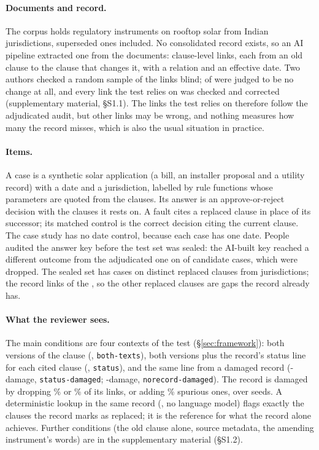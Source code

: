 \paragraph{Documents and record.}
The corpus holds \NCorpusDocs{} regulatory instruments on rooftop solar from \NCorpusJurisdictions{} Indian
jurisdictions, superseded ones included. No consolidated record exists, so an AI pipeline extracted one from the
documents: \NLinksRegistry{} clause-level links, each from an old clause to the clause that changes it, with a relation
and an effective date. Two authors checked a random sample of the links blind; \NLinksSampleNotALink{} of
\NLinksSample{} were judged to be no change at all, and every link the test relies on was checked and corrected
(supplementary material, \S S1.1). The links the test relies on therefore follow the adjudicated audit, but other links may be wrong, and nothing
measures how many the record misses, which is also the usual situation in practice.

\paragraph{Items.}
A case is a synthetic solar application (a bill, an installer proposal and a utility record) with a date and a
jurisdiction, labelled by rule functions whose parameters are quoted from the clauses. Its answer is an
approve-or-reject decision with the clauses it rests on. A fault cites a replaced clause in place of its successor; its
matched control is the correct decision citing the current clause. The case study has no date control, because each case has
one date. People audited the answer key before the test set was sealed: the AI-built key reached a different outcome
from the adjudicated one on \NDroppedDecision{} of \NCandidateCases{} candidate cases, which were dropped. The sealed
set has \NTestCases{} cases on \NClauses{} distinct replaced clauses from \NStates{} jurisdictions; the record links
\NRegistryFlagged{} of the \NClauses, so the other replaced clauses are gaps the record already has.

\paragraph{What the reviewer sees.}
The main conditions are four contexts of the test (\S\ref{sec:framework}): both versions of the clause (, \texttt{both-texts}),
both versions plus the record's status line for each cited clause (, \texttt{status}), and the same line from
a damaged record (-damage, \texttt{status-damaged}; -damage, \texttt{norecord-damaged}). The record
is damaged by dropping \DamageDropTwentyFive\% or \DamageDropFifty\% of its links, or adding \DamageSpuriousTen\%
spurious ones, over \NDamageSeeds{} seeds. A deterministic lookup in the same record (, no language model)
flags exactly the clauses the record marks as replaced; it is the reference for what the record alone achieves.
Further conditions (the old clause alone, source metadata, the amending instrument's words) are in the supplementary
material (\S S1.2).

